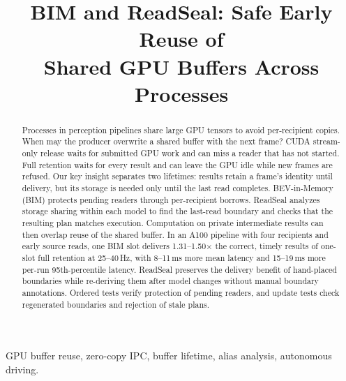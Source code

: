 \documentclass[conference]{IEEEtran}
\newcommand{\ms}{\,ms}
\newcommand{\Hz}{\,Hz}
\begin{document}
\title{BIM and ReadSeal: Safe Early Reuse of\\ Shared GPU Buffers Across Processes}

\author{
}

\maketitle

\begin{abstract}
Processes in perception pipelines share large GPU tensors to avoid per-recipient copies. When may the producer overwrite a shared buffer with the next frame? CUDA stream-only release waits for submitted GPU work and can miss a reader that has not started. Full retention waits for every result and can leave the GPU idle while new frames are refused. Our key insight separates two lifetimes: results retain a frame's identity until delivery, but its storage is needed only until the last read completes. BEV-in-Memory (BIM) protects pending readers through per-recipient borrows. ReadSeal analyzes storage sharing within each model to find the last-read boundary and checks that the resulting plan matches execution. Computation on private intermediate results can then overlap reuse of the shared buffer. In an A100 pipeline with four recipients and early source reads, one BIM slot delivers 1.31--1.50$\times$ the correct, timely results of one-slot full retention at 25--40\Hz, with 8--11\ms{} more mean latency and 15--19\ms{} more per-run 95th-percentile latency. ReadSeal preserves the delivery benefit of hand-placed boundaries while re-deriving them after model changes without manual boundary annotations. Ordered tests verify protection of pending readers, and update tests check regenerated boundaries and rejection of stale plans.
\end{abstract}

\begin{IEEEkeywords}
GPU buffer reuse, zero-copy IPC, buffer lifetime, alias analysis, autonomous driving.
\end{IEEEkeywords}

\end{document}
